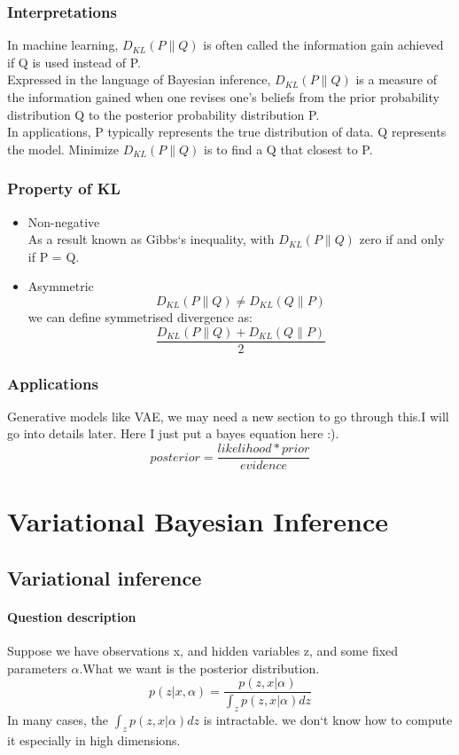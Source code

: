 \documentclass{article}
\begin{document}
\subsubsection{Interpretations}
In machine learning, $D_{KL}(P \parallel Q)$ is often called the information gain achieved if Q is used instead of P.
\\
Expressed in the language of Bayesian inference, $D_{KL}(P \parallel Q)$ is a measure of the information gained when one revises one's beliefs from the prior probability distribution Q to the posterior probability distribution P.\\
In applications, P typically represents the true distribution of data. Q represents the model. Minimize $D_{KL}(P \parallel Q)$ is to find a Q that closest to P.  
\subsubsection{Property of KL}
\begin{itemize}
\item Non-negative \\
As a result known as Gibbs`s inequality, with $D_{KL}(P \parallel Q)$ zero if and only if P = Q.
\item Asymmetric
$$D_{KL}(P \parallel Q) \neq D_{KL}(Q \parallel P)$$
we can define symmetrised divergence as:
$$\frac{D_{KL}(P \parallel Q) + D_{KL}(Q \parallel P)}{2}$$
\end{itemize}

\subsubsection{Applications}
Generative models like VAE, we may need a new section to go through this.I will go into details later. Here I just put a bayes equation here :). 
$$posterior=\frac{likelihood * prior}{evidence}$$
\section{Variational Bayesian Inference}
\subsection{Variational inference}
\paragraph{Question description} Suppose we have observations x, and hidden variables z, and some fixed parameters $\alpha$.What we want is the posterior distribution.
$$p(z|x,\alpha)=\frac{p(z,x|\alpha)}{\int_z p(z,x|\alpha)dz}$$
In many cases, the $\int_z p(z,x|\alpha)dz$ is intractable. we don`t know how to compute it especially in high dimensions.
\end{document}
